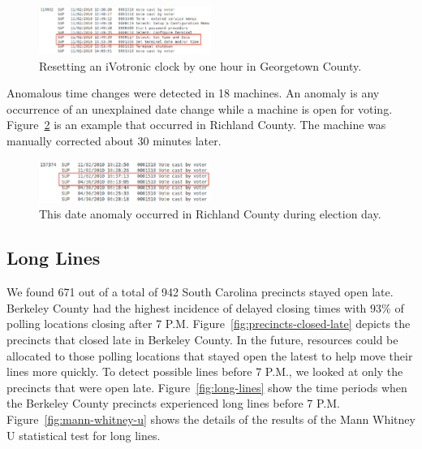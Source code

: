 \documentclass[letterpaper,twocolumn,10pt]{article}
\begin{document}
\begin{figure}[htbp]
\begin{center}
    \includegraphics[width=0.5\textwidth,height=0.1\textheight]{ResetClock.eps}
\end{center}
\caption{Resetting an iVotronic clock by one hour in Georgetown County.}
\label{fig:one-hour-reset}
\end{figure}

Anomalous time changes were detected in 18 machines. An anomaly is any
occurrence of an unexplained date change while a machine is open for
voting. Figure~\ref{fig:date-anomaly} is an example that occurred in Richland
County. The machine was manually corrected about 30 minutes later.  

\begin{figure}[htbp]
\begin{center}
    \includegraphics[width=0.5\textwidth,height=0.1\textheight]{DateAnomaly.eps}
\end{center}
\caption{This date anomaly occurred in Richland County during election day.}
\label{fig:date-anomaly}
\end{figure}

\subsection{Long Lines}
We found 671 out of a total of 942 South Carolina precincts stayed open
late. Berkeley County had the highest incidence of delayed closing times with
$93\%$ of polling locations closing after 7
P.M\@. Figure~\ref{fig:precincts-closed-late} depicts the precincts 
that closed late in Berkeley County. In the future, resources could be allocated
to those polling locations that stayed open the latest to help move their lines
more quickly. To detect possible lines before 7 P.M., we looked at only the
precincts that were open late. Figure~\ref{fig:long-lines} show the time periods
when the Berkeley County precincts experienced long lines before 7
P.M. Figure~\ref{fig:mann-whitney-u} shows the details of the results of the
Mann Whitney U statistical test for long lines.
\end{document}
